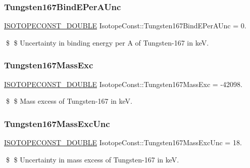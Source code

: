 \subsubsection{\texorpdfstring{Tungsten167\+Bind\+E\+Per\+A\+Unc}{Tungsten167BindEPerAUnc}}
{\footnotesize\ttfamily \mbox{\hyperlink{group___isotope_const-_macros_ga8f45a7272ce02c0b4c65c44636ed719a}{I\+S\+O\+T\+O\+P\+E\+C\+O\+N\+S\+T\+\_\+\+D\+O\+U\+B\+LE}} Isotope\+Const\+::\+Tungsten167\+Bind\+E\+Per\+A\+Unc = 0.}

\$ \$ Uncertainty in binding energy per A of Tungsten-\/167 in keV. \mbox{\label{group___isotope_const-_tungsten-_w167_ga594e788214e2025d11c7768a5effd8a8}} 
\subsubsection{\texorpdfstring{Tungsten167\+Mass\+Exc}{Tungsten167MassExc}}
{\footnotesize\ttfamily \mbox{\hyperlink{group___isotope_const-_macros_ga8f45a7272ce02c0b4c65c44636ed719a}{I\+S\+O\+T\+O\+P\+E\+C\+O\+N\+S\+T\+\_\+\+D\+O\+U\+B\+LE}} Isotope\+Const\+::\+Tungsten167\+Mass\+Exc = -\/42098.}

\$ \$ Mass excess of Tungsten-\/167 in keV. \mbox{\label{group___isotope_const-_tungsten-_w167_ga1f35eded664c9f8a38ce3e61b0688682}} 
\subsubsection{\texorpdfstring{Tungsten167\+Mass\+Exc\+Unc}{Tungsten167MassExcUnc}}
{\footnotesize\ttfamily \mbox{\hyperlink{group___isotope_const-_macros_ga8f45a7272ce02c0b4c65c44636ed719a}{I\+S\+O\+T\+O\+P\+E\+C\+O\+N\+S\+T\+\_\+\+D\+O\+U\+B\+LE}} Isotope\+Const\+::\+Tungsten167\+Mass\+Exc\+Unc = 18.}

\$ \$ Uncertainty in mass excess of Tungsten-\/167 in keV. \mbox{\label{group___isotope_const-_tungsten-_w167_ga0a1c5e1e9ce3d71cbbffe0fd04053883}} 
